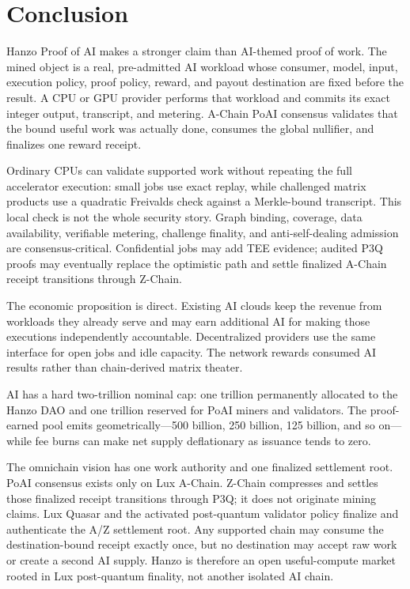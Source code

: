 \section{Conclusion}

Hanzo Proof of AI makes a stronger claim than AI-themed proof of work. The mined
object is a real, pre-admitted AI workload whose consumer, model, input,
execution policy, proof policy, reward, and payout destination are fixed before
the result. A CPU or GPU provider performs that workload and commits its exact
integer output, transcript, and metering. A-Chain PoAI consensus validates that
the bound useful work was actually done, consumes the global nullifier, and
finalizes one reward receipt.

Ordinary CPUs can validate supported work without repeating the full accelerator
execution: small jobs use exact replay, while challenged matrix products use a
quadratic Freivalds check against a Merkle-bound transcript. This local check is
not the whole security story. Graph binding, coverage, data availability,
verifiable metering, challenge finality, and anti-self-dealing admission are
consensus-critical. Confidential jobs may add TEE evidence; audited P3Q proofs
may eventually replace the optimistic path and settle finalized A-Chain receipt
transitions through Z-Chain.

The economic proposition is direct. Existing AI clouds keep the revenue from
workloads they already serve and may earn additional AI for making those
executions independently accountable. Decentralized providers use the same
interface for open jobs and idle capacity. The network rewards consumed AI
results rather than chain-derived matrix theater.

AI has a hard two-trillion nominal cap: one trillion permanently allocated to
the Hanzo DAO and one trillion reserved for PoAI miners and validators. The
proof-earned pool emits geometrically---500 billion, 250 billion, 125 billion,
and so on---while fee burns can make net supply deflationary as issuance tends
to zero.

The omnichain vision has one work authority and one finalized settlement root.
PoAI consensus exists only on Lux A-Chain. Z-Chain compresses and settles those
finalized receipt transitions through P3Q; it does not originate mining claims.
Lux Quasar and the activated post-quantum validator policy finalize and
authenticate the A/Z settlement root. Any supported chain may consume the
destination-bound receipt exactly once, but no destination may accept raw work
or create a second AI supply. Hanzo is therefore an open useful-compute market
rooted in Lux post-quantum finality, not another isolated AI chain.

